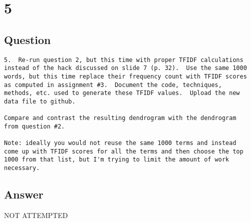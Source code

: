 \documentclass[letterpaper,11pt]{article}
\begin{document}

\clearpage


\section*{5}

\subsection*{Question}

\begin{verbatim}
5.  Re-run question 2, but this time with proper TFIDF calculations
instead of the hack discussed on slide 7 (p. 32).  Use the same 1000
words, but this time replace their frequency count with TFIDF scores
as computed in assignment #3.  Document the code, techniques,
methods, etc. used to generate these TFIDF values.  Upload the new
data file to github.

Compare and contrast the resulting dendrogram with the dendrogram
from question #2.

Note: ideally you would not reuse the same 1000 terms and instead
come up with TFIDF scores for all the terms and then choose the top
1000 from that list, but I'm trying to limit the amount of work
necessary.
\end{verbatim}

\subsection*{Answer}

\begin{center}
\Huge{NOT ATTEMPTED}
\end{center}


\clearpage

\end{document}
